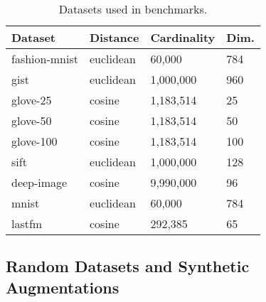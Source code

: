 \begin{table}[!t]
    \caption{Datasets used in benchmarks.}
    \label{table:datasets:summary}
    \vskip 0.15in
    \begin{center}
        \begin{small}
            \begin{sc}
                \begin{tabular}{|l|l|l|l|}
                    \hline
                    \textbf{Dataset} & \textbf{Distance}  &\textbf{Cardinality}  & \textbf{Dim.}  \\
                    \hline
                    fashion-mnist    & euclidean              & 60,000             & 784       \\
                    \hline 
                    gist             & euclidean              & 1,000,000          & 960       \\
                    \hline
                    glove-25         & cosine              & 1,183,514          & 25        \\
                    \hline
                    glove-50         & cosine              & 1,183,514          & 50        \\
                    \hline
                    glove-100        & cosine              & 1,183,514          & 100       \\
                    \hline
                    sift             & euclidean              & 1,000,000          & 128       \\
                    \hline
                    deep-image       & cosine              & 9,990,000          & 96        \\
                    \hline
                    mnist            & euclidean              & 60,000             & 784       \\
                    \hline
                    lastfm           & cosine              & 292,385            & 65        \\
                    \hline
                \end{tabular}
            \end{sc}
        \end{small}
    \end{center}
    \vskip -0.1in
\end{table}

\subsection{Random Datasets and Synthetic Augmentations}
\label{subsec:random-datasets}

